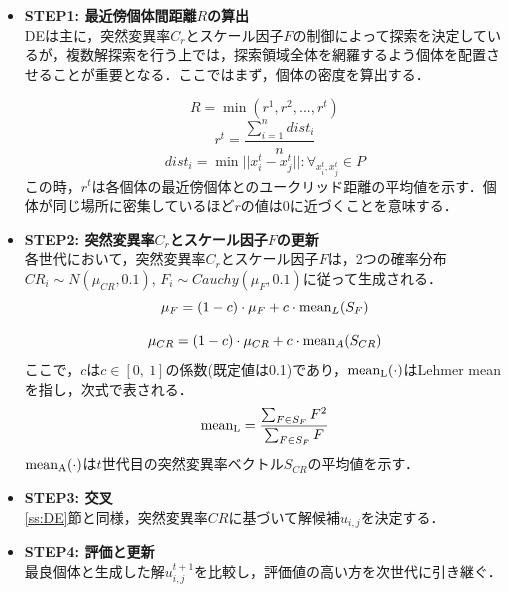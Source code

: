 \documentclass[a4j,11pt]{jarticle}
\begin{document}
\begin{itemize}
\item {\bf STEP1: 最近傍個体間距離$R$の算出} \\
DEは主に，突然変異率$C_r$とスケール因子$F$の制御によって探索を決定しているが，複数解探索を行う上では，探索領域全体を網羅するよう個体を配置させることが重要となる．ここではまず，個体の密度を算出する．

\begin{equation}
\label{eq:dADE-rmin}
R=\min{(r^1, r^2, ...,r^t)}
\end{equation}
\begin{equation}
\label{eq:dADE-r}
r^t=\frac{\sum_{i=1}^n dist_i}{n}
\end{equation}
\begin{equation}
\label{eq:dADE-dist}
dist_i=\min{||x_i^t-x_j^t||:\forall_{x_i^t, x_j^t} \in P}
\end{equation}
この時，$r^t$は各個体の最近傍個体とのユークリッド距離の平均値を示す．個体が同じ場所に密集しているほど$r$の値は0に近づくことを意味する．

\item {\bf STEP2: 突然変異率$C_r$とスケール因子$F$の更新} \\
各世代において，突然変異率$C_r$とスケール因子$F$は，2つの確率分布$CR_i \sim N(\mu_{CR},0.1)$, $F_i \sim Cauchy(\mu_F, 0.1)$に従って生成される．
\begin{equation}
\label{eq:dADE-f}
\mu_F = (1-c) \cdot \mu_F + c \cdot {\rm mean}_L(S_F)
\end{equation}

\begin{equation}
\label{eq:dADE-cr}
\mu_{CR} = (1-c) \cdot \mu_{CR} + c \cdot {\rm mean}_A(S_{CR})
\end{equation}
ここで，$c$は$c \in [0, \ 1]$の係数(既定値は0.1)であり，${\rm mean_L}(\cdot)$はLehmer mean \cite{Lehmer} を指し，次式で表される．
\begin{equation}
{\rm mean_L}=\frac{\sum_{F \in S_F}F^2}{\sum_{F \in S_F}F}
\end{equation}
 ${\rm mean_A}(\cdot)$は$t$世代目の突然変異率ベクトル$S_{CR}$の平均値を示す．

\item {\bf STEP3: 交叉} \\
\ref{ss:DE}節と同様，突然変異率$CR$に基づいて解候補$u_{i,j}$を決定する．

\item {\bf STEP4: 評価と更新} \\
最良個体と生成した解$u_{i,j}^{t+1}$を比較し，評価値の高い方を次世代に引き継ぐ．


\end{itemize}
\end{document}
